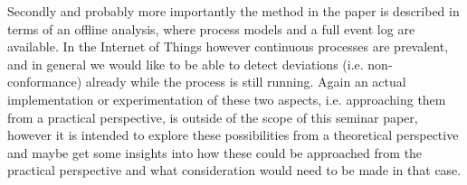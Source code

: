 \documentclass[runningheads]{template/llncs}
\begin{document}
Secondly and probably more importantly the method in the paper is described in terms of an offline analysis, where process models and a full event log are available. In the Internet of Things however continuous processes are prevalent, and in general we would like to be able to detect deviations (i.e. non-conformance) already while the process is still running.
Again an actual implementation or experimentation of these two aspects, i.e. approaching them from a practical perspective, is outside of the scope of this seminar paper, however it is intended to explore these possibilities from a theoretical perspective and maybe get some insights into how these could be approached from the practical perspective and what consideration would need to be made in that case.
%
%
%


%
\end{document}

